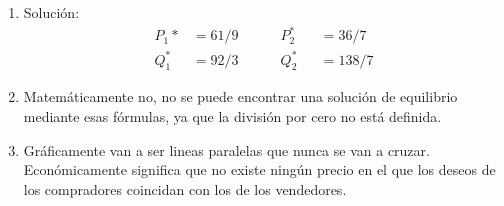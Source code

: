 \begin{ejercicio}
\begin{enumerate}
        En el caso de la oferta \((Q_s)\), el \(-4\) nos indica que para empezar la producción necesitamos un precio que supere ese nivel, y en el caso de \(8\) indica que por cada \(\mathdollar{1}\) adicional, estamos dispuestos a ofrecer 8 productos más.

        Solución:
        $$
        \begin{aligned}
        P^* &= 25/11 \\
        Q^* &= 156/11
        \end{aligned}
        $$
        \item Solución:
        $$
        \begin{aligned}
        P_1* &= 61/9 \qquad \quad P_2^* &&= 36/7\\
        Q_1^* &= 92/3 \qquad \quad Q_2^* &&= 138/7
        \end{aligned}
        $$
        \item Matemáticamente no, no se puede encontrar una solución de equilibrio mediante esas fórmulas, ya que la división por cero no está definida.
        \item Gráficamente van a ser lineas paralelas que nunca se van a cruzar. Económicamente significa que no existe ningún precio en el que los deseos de los compradores coincidan con los de los vendedores.
    \end{enumerate}
\end{ejercicio}